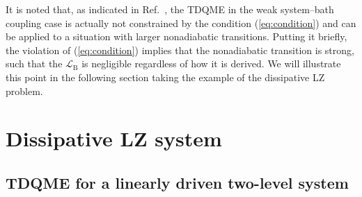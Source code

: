 \documentclass[english,nofootinbib, pra, twocolumn,superscriptaddress]{revtex4-1}
\begin{document}
It is noted that, as indicated in Ref.~\citep{2017.Ogawa},
the TDQME in the weak system--bath coupling case is actually not constrained
by the condition (\ref{eq:condition}) and can be applied to
a situation with larger nonadiabatic transitions. Putting it briefly, the violation of (\ref{eq:condition})
implies that the nonadiabatic transition is strong, such that the
$\mathcal{L}_{\text{B}}$ is negligible regardless of how it is derived. We will illustrate this point in the following
section taking the example of the dissipative LZ problem.

\section{Dissipative LZ system}

\subsection{TDQME for a linearly driven two-level system}
\end{document}
